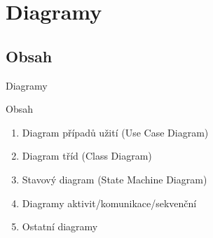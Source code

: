 \section{Diagramy}


\subsection{Obsah}


\begin{frame}{Diagramy}

\onslide<+-> Obsah

\begin{enumerate}
	\item<+-> Diagram případů užití (Use Case Diagram)
	\item<+-> Diagram tříd (Class Diagram)
	\item<+-> Stavový diagram (State Machine Diagram)
	\item<+-> Diagramy aktivit/komunikace/sekvenční
	\item<+-> Ostatní diagramy
\end{enumerate}

\end{frame}


	
	
	
	
	
